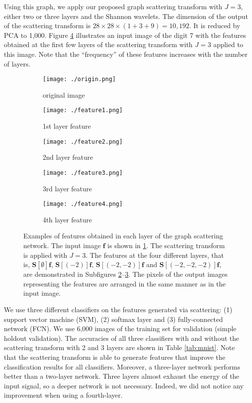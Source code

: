 \documentclass{article}
\def\BS{\boldsymbol{S}}
\def\Bf{\boldsymbol{f}}
\begin{document}
Using this graph, we apply our proposed graph scattering transform with $J=3$, either two or three layers {and the Shannon wavelets}. {The dimension of the output of the scattering transform is $28 \times 28 \times (1+3+9) = 10,192$. It is reduced by PCA to 1,000.}
Figure \ref{fig:mnistFeatures} illustrates {an input image of the digit 7 with the features obtained at the first few layers of the scattering transform with $J=3$ applied to this image. Note that the ``frequency'' of these features} increases with the number of layers.


\begin{figure}[!ht]
\centering
\begin{subfigure}{.19\textwidth}
	\centering
    \texttt{[image: ./origin.png]}
    \caption{original image}
    \label{fig:origin7}
\end{subfigure}
\begin{subfigure}{.19\textwidth}
	\centering
    \texttt{[image: ./feature1.png]}
    \caption{1st layer feature}
    \label{fig:scat71st}
\end{subfigure}
\begin{subfigure}{.19\textwidth}
	\centering
    \texttt{[image: ./feature2.png]}
    \caption{2nd layer feature}
\end{subfigure}
\begin{subfigure}{.19\textwidth}
	\centering
    \texttt{[image: ./feature3.png]}
    \caption{3rd layer feature}
\end{subfigure}
\begin{subfigure}{.19\textwidth}
	\centering
    \texttt{[image: ./feature4.png]}
    \caption{4th layer feature}
    \label{fig:scat74th}
\end{subfigure}
\caption{Examples of features obtained in each layer of the graph scattering network.
The input image $\Bf$ is shown in \ref{fig:origin7}. The scattering transform is applied with $J=3$. The features at the four different layers{, that is, $\BS[\emptyset] \Bf$, $\BS[(-2)] \Bf$, $\BS[(-2,-2)] \Bf$ and $\BS[(-2,-2,-2)] \Bf$,} are demonstrated in Subfigures \ref{fig:scat71st}--\ref{fig:scat74th}.
The pixels of the output images representing the features are arranged in the same manner as in the input image.  
}
\label{fig:mnistFeatures}
\end{figure}

We use three different classifiers on the features generated via scattering: (1) support vector machine (SVM), (2) softmax layer and (3) fully-connected network (FCN). We use 6,000 images of the training set for validation (simple holdout validation). The accuracies of all three classifiers with and without the scattering transform with 2 and 3 layers are shown in Table \ref{tab:mnist}. Note that the scattering transform is able to generate features that improve the classification results for all classifiers. Moreover, a three-layer network performs better than a two-layer network. 
Three layers almost exhaust the energy of the input signal, so a deeper network is not necessary.
Indeed, we did not notice any improvement when using a fourth-layer.
\end{document}
